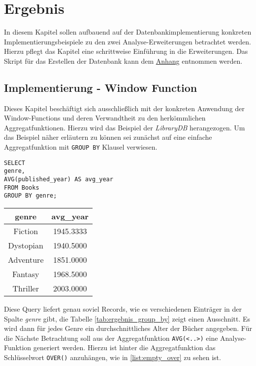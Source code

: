 \chapter{Ergebnis}
\label{chap:ergebnis} In diesem Kapitel sollen aufbauend auf der Datenbankimplementierung
konkreten Implementierungsbeispiele zu den zwei Analyse-Erweiterungen betrachtet
werden. Hierzu pflegt das Kapitel eine schrittweise Einführung in die
Erweiterungen. Das Skript für das Erstellen der Datenbank kann dem \hyperref[sec:library_db]{Anhang}
entnommen werden.

\section{Implementierung - Window Function}
\label{sec:window_function} Dieses Kapitel beschäftigt sich ausschließlich mit der
konkreten Anwendung der Window-Functions und deren Verwandtheit zu den herkömmlichen
Aggregatfunktionen. Hierzu wird das Beispiel der \textit{LibraryDB} herangezogen.
Um das Beispiel näher erläutern zu können sei zunächst auf eine einfache
Aggregatfunktion mit \texttt{GROUP BY} Klausel verwiesen.

\begin{minipage}{0.55\textwidth}
	 \begin{lstlisting}
SELECT
genre,
AVG(published_year) AS avg_year
FROM Books
GROUP BY genre;
	\end{lstlisting}
\end{minipage}
\hfill
\begin{minipage}{0.45\textwidth}
	\centering
	\begin{tabular}{|c|c|}
		\hline
		\textbf{genre} & \textbf{avg\_year} \\
		\hline
		Fiction        & 1945.3333          \\
		\hline
		Dystopian      & 1940.5000          \\
		\hline
		Adventure      & 1851.0000          \\
		\hline
		Fantasy        & 1968.5000          \\
		\hline
		Thriller       & 2003.0000          \\
		\hline
	\end{tabular}
	 \label{tab:ergebnis_group_by}
\end{minipage}

Diese Query liefert genau soviel Records, wie es verschiedenen Einträger in der Spalte
\textit{genre} gibt, die Tabelle \ref{tab:ergebnis_group_by} zeigt einen Ausschnitt.
Es wird dann für jedes Genre ein durchschnittliches Alter der Bücher angegeben. Für
die Nächste Betrachtung soll aus der Aggregatfunktion \texttt{AVG(<..>)} eine
Analyse-Funktion generiert werden. Hierzu ist hinter die Aggregatfunktion das Schlüsselwort
\texttt{OVER()} anzuhängen, wie in \ref{list:empty_over} zu sehen ist.

